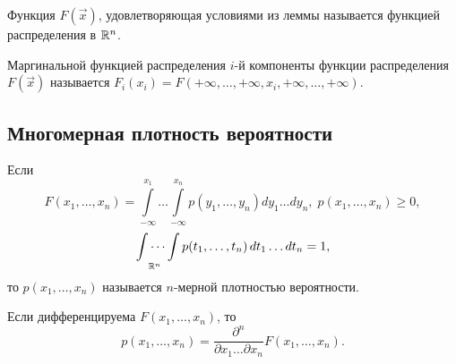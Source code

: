 \begin{definition}
	Функция $F(\vec x)$, удовлетворяющая условиями из леммы называется функцией распределения в $\mathbb{R}^n$.
\end{definition}

\begin{definition}
    Маргинальной функцией распределения $i$-й компоненты функции распределения $F(\vec x)$ называется $F_i (x_i) = F(+\infty, \dots, +\infty, x_i, +\infty, \dots, +\infty)$.
\end{definition}

\subsection{Многомерная плотность вероятности}
\begin{definition}
	Если 
	$$ F(x_1, \ldots, x_n) = \int\limits_{-\infty}^{x_1}\dots\int\limits_{-\infty}^{x_n} p(y_1, \ldots, y_n)dy_1\ldots dy_n,\; p(x_1, \ldots, x_n) \geqslant 0, $$
	$$ \idotsint\limits_{\mathbb{R}^n} p(t_1, \dots, t_n) \,dt_1 \dots dt_n = 1,$$
	то $p(x_1, \ldots, x_n)$ называется $n$-мерной плотностью вероятности.
	
	Если дифференцируема $F(x_1, \dots, x_n)$, то
	$$ p(x_1, \ldots, x_n) = \frac{\partial^n}{\partial x_1\ldots\partial x_n}F(x_1, \ldots, x_n). $$
\end{definition}